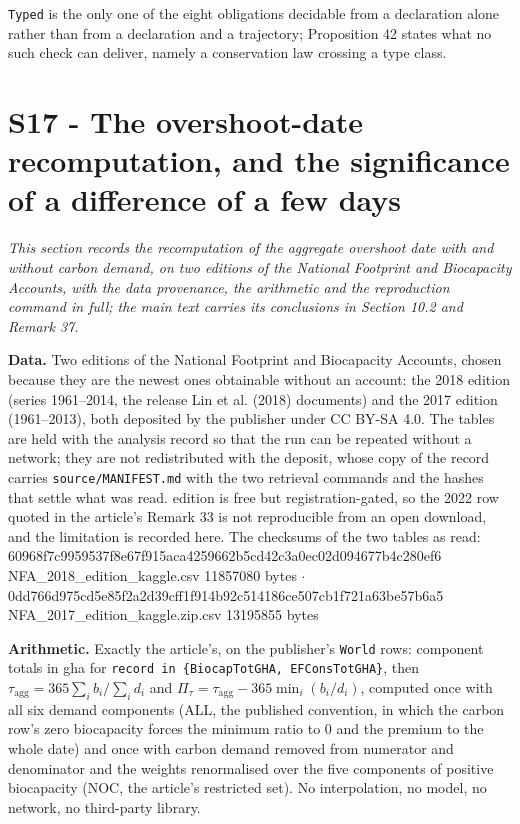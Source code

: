 \documentclass[11pt]{article}
\begin{document}
\texttt{Typed} is the only one of the eight obligations decidable from a declaration alone rather than from a declaration and a trajectory; Proposition 42 states what no such check can deliver, namely a conservation law crossing a type class.

\section*{S17 - The overshoot-date recomputation, and the significance of a difference of a few days}\label{s17---the-overshoot-date-recomputation-and-the-significance-of-a-diffe}

\emph{This section records the recomputation of the aggregate overshoot date with and without carbon demand, on two editions of the National Footprint and Biocapacity Accounts, with the data provenance, the arithmetic and the reproduction command in full; the main text carries its conclusions in Section 10.2 and Remark 37.}

\textbf{Data.} Two editions of the National Footprint and Biocapacity Accounts, chosen because they are the newest ones obtainable without an account: the 2018 edition (series 1961--2014, the release Lin et al. (2018) documents) and the 2017 edition (1961--2013), both deposited by the publisher under CC BY-SA 4.0. The tables are held with the analysis record so that the run can be repeated without a network; they are not redistributed with the deposit, whose copy of the record carries \texttt{source/\allowbreak{}MANIFEST.\allowbreak{}md} with the two retrieval commands and the hashes that settle what was read. edition is free but registration-gated, so the 2022 row quoted in the article's Remark 33 is not reproducible from an open download, and the limitation is recorded here. The checksums of the two tables as read: 60968f7c9959537f\allowbreak{}8e67f915aca42596\allowbreak{}62b5cd42c3a0ec02\allowbreak{}d094677b4c280ef6  NFA\_2018\_edition\_kaggle.csv  11857080 bytes \(\cdot\) 0dd766d975cd5e85\allowbreak{}f2a2d39cff1f914b\allowbreak{}92c514186ce507cb\allowbreak{}1f721a63be57b6a5  NFA\_2017\_edition\_kaggle.zip.csv  13195855 bytes

\textbf{Arithmetic.} Exactly the article's, on the publisher's \texttt{World} rows: component totals in gha for \texttt{record in \{B\allowbreak{}iocapTotGHA,\allowbreak{} EFConsTotGH\allowbreak{}A\}}, then \(\tau_{\mathrm{agg}} = 365\sum_i b_i/\sum_i d_i\) and \(\Pi_\tau = \tau_{\mathrm{agg}} - 365\min_i(b_i/\allowbreak{}d_i)\), computed once with all six demand components (ALL, the published convention, in which the carbon row's zero biocapacity forces the minimum ratio to 0 and the premium to the whole date) and once with carbon demand removed from numerator and denominator and the weights renormalised over the five components of positive biocapacity (NOC, the article's restricted set). No interpolation, no model, no network, no third-party library.
\end{document}
